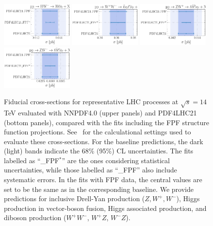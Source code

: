 \begin{figure}[htbp]
\includegraphics[width=0.32\textwidth]{plots/LHCpheno/NNPDF_HWM_14TEV_40_PHENO-integrated-pdf4lhc21.pdf}
\includegraphics[width=0.32\textwidth]{plots/LHCpheno/NNPDF_WPWM_14TEV_40_PHENO-integrated-pdf4lhc21.pdf}
\includegraphics[width=0.32\textwidth]{plots/LHCpheno/NNPDF_WPZ_14TEV_40_PHENO-integrated-pdf4lhc21.pdf}
\includegraphics[width=0.32\textwidth]{plots/LHCpheno/NNPDF_WMZ_14TEV_40_PHENO-integrated-pdf4lhc21.pdf}
\caption{Fiducial cross-sections for representative LHC processes at $\sqrt{s}=14$ TeV
  evaluated with NNPDF4.0 (upper panels) and PDF4LHC21 (bottom panels),
  compared with the fits including the FPF structure function projections.
  See~\cite{NNPDF:2021njg,PDF4LHCWorkingGroup:2022cjn} for the calculational settings
  used to evaluate these cross-sections.
%
For the baseline
predictions, the dark (light) bands indicate the 68\% (95\%) CL uncertainties.
%
The fits labelled as ``\_FPF$^*$'' are the ones considering statistical uncertainties,
while those labelled as ``\_FPF'' also include systematic errors.
%
In the fits with FPF data, the central values are set to be the same as
in the corresponding baseline.
%
We provide predictions for inclusive Drell-Yan production ($Z, W^+, W^-$), Higgs production
in vector-boson fusion, Higgs associated
production, and diboson production ($W^+W^-$, $W^+Z$, $W^-Z$).
%
}
\label{fig:NNPDF40_pheno_integrated}
\end{figure}

